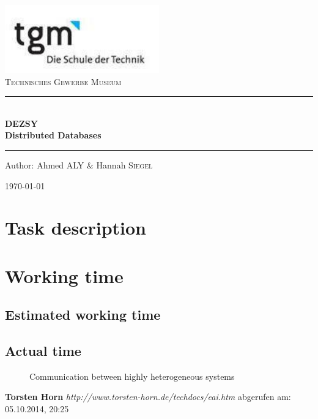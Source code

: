 \documentclass[a4paper]{article}
\begin{document}
\begin{titlepage}
\begin{center}
\includegraphics[width=0.5\textwidth]{images/logo}\\[1cm]    

\textsc{\LARGE Technisches Gewerbe Museum}\\[1.5cm]

\rule{12cm}{1mm}
{ \huge \bfseries  \\\large DEZSY\\ \huge Distributed Databases \\[0.4cm] }

\rule{12cm}{1mm}

\noindent 
\vspace{5cm}

\begin{center}
\large
Author: 
Ahmed \textsc{ALY} \&
Hannah \textsc{Siegel}
\end{center}

\vfill

{\large \today}

\end{center}
\end{titlepage}

\tableofcontents

\newpage

\section{Task description}

\section{Working time}
\subsection{Estimated working time}
\subsection{Actual time}

 \begin{figure}[here!]
	\centering
	\caption{Communication between highly heterogeneous systems \cite{muede}}
	\label{fig:anfang}
	\end{figure}
\newpage
\printglossaries
\listoffigures
\newpage
\begin{thebibliography}{56}

   \textbf{Torsten Horn}\newline
  \emph{http://www.torsten-horn.de/techdocs/eai.htm}
  \newline abgerufen am: 05.10.2014, 20:25


\end{thebibliography}
\end{document}
